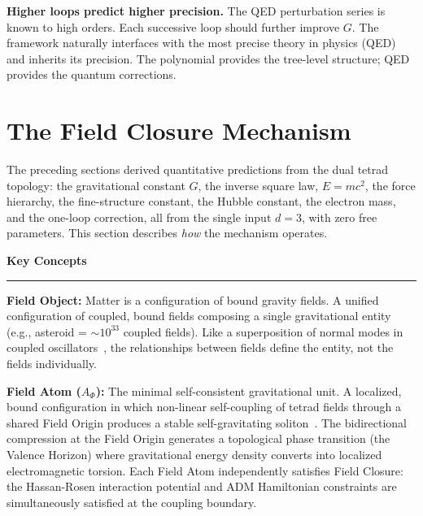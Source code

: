 \documentclass[aps,prd,preprint,superscriptaddress,showpacs,preprintnumbers,amsmath,amssymb,nofootinbib]{revtex4-2}
\begin{document}
\textbf{Higher loops predict higher precision.} The QED perturbation series is known to high orders. Each successive loop should further improve $G$. The framework naturally interfaces with the most precise theory in physics (QED) and inherits its precision. The polynomial provides the tree-level structure; QED provides the quantum corrections.

\section{The Field Closure Mechanism}
\label{sec:mechanism}

The preceding sections derived quantitative predictions from the dual tetrad topology: the gravitational constant $G$, the inverse square law, $E = mc^2$, the force hierarchy, the fine-structure constant, the Hubble constant, the electron mass, and the one-loop correction, all from the single input $d = 3$, with zero free parameters. This section describes \emph{how} the mechanism operates.

\vspace{1em}
\noindent\textbf{Key Concepts}

\noindent\rule{\textwidth}{0.4pt}

\noindent\textbf{Field Object:} Matter is a configuration of bound gravity fields. A unified configuration of coupled, bound fields composing a single gravitational entity (e.g., asteroid = $\sim 10^{33}$ coupled fields). Like a superposition of normal modes in coupled oscillators~\cite{goldstein2002,feynman1985}, the relationships between fields define the entity, not the fields individually.

\smallskip

\noindent\textbf{Field Atom ($A_\Phi$):} The minimal self-consistent gravitational unit. A localized, bound configuration in which non-linear self-coupling of tetrad fields through a shared Field Origin produces a stable self-gravitating soliton~\cite{wheeler1955}. The bidirectional compression at the Field Origin generates a topological phase transition (the Valence Horizon) where gravitational energy density converts into localized electromagnetic torsion. Each Field Atom independently satisfies Field Closure: the Hassan-Rosen interaction potential and ADM Hamiltonian constraints are simultaneously satisfied at the coupling boundary.
\end{document}
